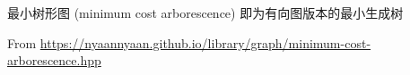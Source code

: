 最小树形图 (minimum cost arborescence) 即为有向图版本的最小生成树

From \url{https://nyaannyaan.github.io/library/graph/minimum-cost-arborescence.hpp}
